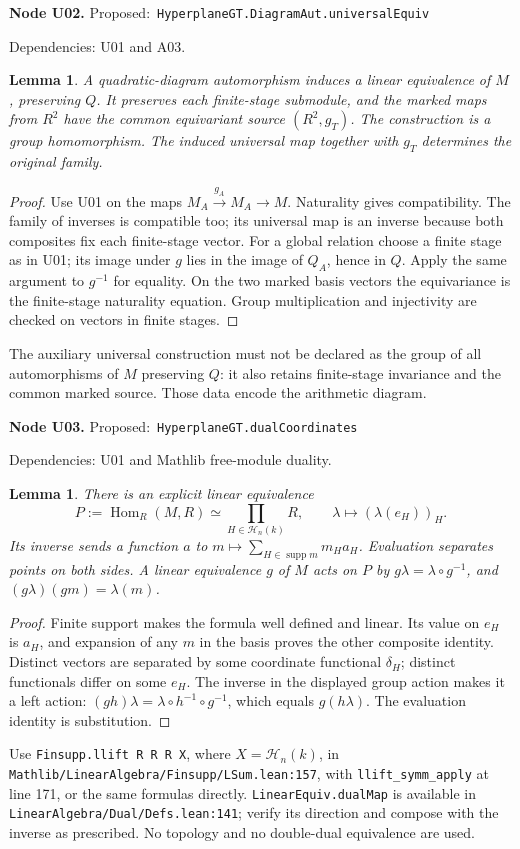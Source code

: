 \documentclass[11pt]{article}
\newtheorem{lemma}[theorem]{Lemma}
\theoremstyle{remark}\newtheorem{remark}[theorem]{Remark}
\newcommand{\cH}{\mathcal H}
\newcommand{\Hom}{\operatorname{Hom}}
\newcommand{\code}[1]{\nolinkurl{#1}}
\newcommand{\node}[3]{\par\Needspace{8\baselineskip}\smallskip\noindent\textbf{Node #1.}\quad
 \textsf{Proposed:}\ \code{#2}\par\noindent
 \textsf{Dependencies:} #3.\par\smallskip}
\begin{document}
\node{U02}{HyperplaneGT.DiagramAut.universalEquiv}{U01 and A03}
\begin{lemma}\label{lem:u02}
A quadratic-diagram automorphism induces a linear equivalence of
$M$, preserving $Q$. It preserves each finite-stage submodule, and
the marked maps from $R^2$ have the common equivariant source
$(R^2,g_T)$. The construction is a group homomorphism. The induced
universal map together with $g_T$ determines the original family.
\end{lemma}
\begin{proof}
Use U01 on the maps $M_A\xrightarrow{g_A}M_A\to M$. Naturality
gives compatibility. The family of inverses is compatible too;
its universal map is an inverse because both composites fix each
finite-stage vector. For a global relation choose a finite stage
as in U01; its image under $g$ lies in the image of $Q_A$, hence
in $Q$. Apply the same argument to $g^{-1}$ for equality. On the
two marked basis vectors the equivariance is the finite-stage
naturality equation. Group multiplication and injectivity are
checked on vectors in finite stages.
\end{proof}
The auxiliary universal construction must not be declared as the
group of all automorphisms of $M$ preserving $Q$: it also retains
finite-stage invariance and the common marked source. Those data
encode the arithmetic diagram.

\node{U03}{HyperplaneGT.dualCoordinates}{U01 and Mathlib free-module duality}
\begin{lemma}\label{lem:u03}
There is an explicit linear equivalence
\[
 P:=\Hom_R(M,R)\simeq\prod_{H\in\cH_n(k)}R,
 \qquad\lambda\longmapsto(\lambda(e_H))_H.
\]
Its inverse sends a function $a$ to
$m\mapsto\sum_{H\in\operatorname{supp}m}m_Ha_H$.
Evaluation separates points on both sides. A linear equivalence
$g$ of $M$ acts on $P$ by $g\lambda=\lambda\circ g^{-1}$, and
$(g\lambda)(gm)=\lambda(m)$.
\end{lemma}
\begin{proof}
Finite support makes the formula well defined and linear. Its value
on $e_H$ is $a_H$, and expansion of any $m$ in the basis proves
the other composite identity. Distinct vectors are separated by
some coordinate functional $\delta_H$; distinct functionals differ
on some $e_H$. The inverse in the displayed group action makes it
a left action: $(gh)\lambda=\lambda\circ h^{-1}\circ g^{-1}$,
which equals $g(h\lambda)$. The evaluation identity is substitution.
\end{proof}
Use \texttt{Finsupp.llift R R R X}, where $X=\cH_n(k)$, in
\code{Mathlib/LinearAlgebra/Finsupp/LSum.lean:157}, with
\code{llift_symm_apply} at line 171, or the same formulas directly.
\code{LinearEquiv.dualMap} is available in
\code{LinearAlgebra/Dual/Defs.lean:141}; verify its direction and
compose with the inverse as prescribed. No topology and no
double-dual equivalence are used.
\end{document}

